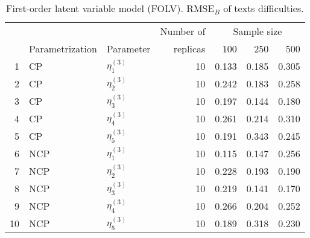 \begin{table}[H]
	\centering
	\begin{tabular}{rllrrrr}
		\hline
		\multicolumn{3}{c}{ } & Number of &\multicolumn{3}{c}{ Sample size } \\ 
		\cmidrule(rl){5-7}
		& Parametrization & Parameter & replicas & 100 & 250 & 500 \\  
		\hline\hline
		1 & CP & $\eta^{(3)}_{1}$ &   10 & 0.133 & 0.185 & 0.305 \\ 
		2 & CP & $\eta^{(3)}_{2}$ &   10 & 0.242 & 0.183 & 0.258 \\ 
		3 & CP & $\eta^{(3)}_{3}$ &   10 & 0.197 & 0.144 & 0.180 \\ 
		4 & CP & $\eta^{(3)}_{4}$ &   10 & 0.261 & 0.214 & 0.310 \\ 
		5 & CP & $\eta^{(3)}_{5}$ &   10 & 0.191 & 0.343 & 0.245 \\ 
		\hline
		6 & NCP & $\eta^{(3)}_{1}$ &   10 & 0.115 & 0.147 & 0.256 \\ 
		7 & NCP & $\eta^{(3)}_{2}$ &   10 & 0.228 & 0.193 & 0.190 \\ 
		8 & NCP & $\eta^{(3)}_{3}$ &   10 & 0.219 & 0.141 & 0.170 \\ 
		9 & NCP & $\eta^{(3)}_{4}$ &   10 & 0.266 & 0.204 & 0.252 \\ 
		10 & NCP & $\eta^{(3)}_{5}$ &   10 & 0.189 & 0.318 & 0.230 \\ 
		\hline
	\end{tabular}
	\caption[First-order latent variable model (FOLV). $\text{RMSE}_{B}$ of texts difficulties.]%
	{First-order latent variable model (FOLV). $\text{RMSE}_{B}$ of texts difficulties.}
	\label{tab:FOLV_RMSE_texts_diff}
\end{table}
%
